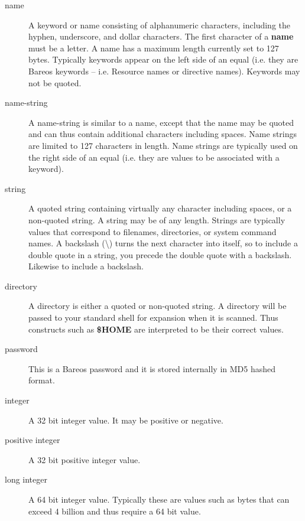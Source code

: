 \begin{description}

\item [name]
   A keyword or name consisting of alphanumeric characters, including the
hyphen, underscore, and dollar  characters. The first character of a {\bf
name} must be  a letter.  A name has a maximum length currently set to 127
bytes.  Typically keywords appear on the left side of an equal (i.e.  they are
Bareos keywords -- i.e. Resource names or  directive names). Keywords may not
be quoted.

\item [name-string]
   A name-string is similar to a name,  except that the name may be quoted and
can thus contain  additional characters including spaces. Name strings  are
limited to 127 characters in length. Name strings  are typically used on the
right side of an equal (i.e.  they are values to be associated with a keyword).


\item [string]
   A quoted string containing virtually any  character including spaces, or a
non-quoted string. A  string may be of any length. Strings are typically
values  that correspond to filenames, directories, or system  command names. A
backslash (\textbackslash{}) turns the next character into  itself, so to
include a double quote in a string, you precede the  double quote with a
backslash. Likewise to include a backslash.

\item [directory]
   A directory is either a quoted or  non-quoted string. A directory will be
passed to your  standard shell for expansion when it is scanned. Thus
constructs such as {\bf \$HOME} are interpreted to be  their correct values.

\item [password]
   This is a Bareos password and it is stored internally in MD5 hashed format.

\item [integer]
   A 32 bit integer value. It may be positive or negative.

\item [positive integer]
   A 32 bit positive integer value.

\item [long integer]
   A 64 bit integer value. Typically these  are values such as bytes that can
exceed 4 billion and thus  require a 64 bit value.


\end{description}
